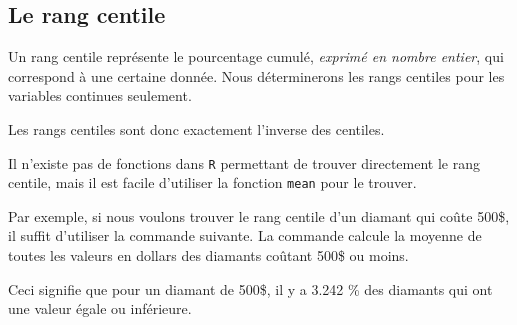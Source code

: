 \documentclass[]{book}
\newenvironment{Shaded}{\begin{snugshade}}{\end{snugshade}}
\newcommand{\DecValTok}[1]{\textcolor[rgb]{0.00,0.00,0.81}{#1}}
\newcommand{\KeywordTok}[1]{\textcolor[rgb]{0.13,0.29,0.53}{\textbf{#1}}}
\newcommand{\NormalTok}[1]{#1}
\newcommand{\OperatorTok}[1]{\textcolor[rgb]{0.81,0.36,0.00}{\textbf{#1}}}
\theoremstyle{definition}
\theoremstyle{definition}
\theoremstyle{definition}
\theoremstyle{remark}
\begin{document}
\hypertarget{le-rang-centile}{%
\subsection{Le rang centile}\label{le-rang-centile}}

Un rang centile représente le pourcentage cumulé, \emph{exprimé en
nombre entier}, qui correspond à une certaine donnée. Nous déterminerons
les rangs centiles pour les variables continues seulement.

Les rangs centiles sont donc exactement l'inverse des centiles.

Il n'existe pas de fonctions dans \texttt{R} permettant de trouver
directement le rang centile, mais il est facile d'utiliser la fonction
\texttt{mean} pour le trouver.

Par exemple, si nous voulons trouver le rang centile d'un diamant qui
coûte 500\$, il suffit d'utiliser la commande suivante. La commande
calcule la moyenne de toutes les valeurs en dollars des diamants coûtant
500\$ ou moins.

\begin{Shaded}
\end{Shaded}

Ceci signifie que pour un diamant de 500\$, il y a 3.242 \% des diamants
qui ont une valeur égale ou inférieure.


\end{document}
